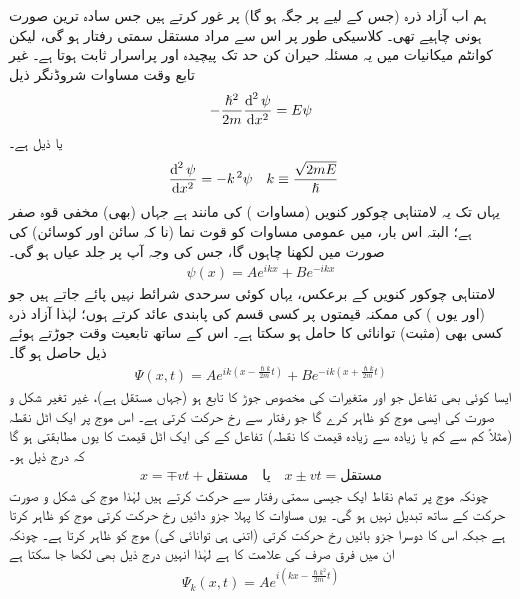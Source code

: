 ہم اب آزاد ذرہ (جس کے لیے پر جگہ  ہو گا) پر غور کرتے ہیں جس سادہ ترین صورت ہونی چاہیے تھی۔ کلاسیکی طور پر اس سے مراد مستقل سمتی رفتار ہو گی، لیکن کوانٹم میکانیات میں یہ مسئلہ حیران کن حد تک پیچیدہ اور پراسرار ثابت ہوتا ہے۔ غیر تابع وقت مساوات شروڈنگر ذیل 
\begin{align}\label{مساوات_شروڈنگر_آزاد_ذرہ_الف}
-\frac{\hslash^{2}}{2m}\frac{\dif^{\,2}{\psi}}{\dif{x^{2}}}=E\psi
\end{align}
یا ذیل ہے۔
\begin{align}
\frac{\dif^{\,2}{\psi}}{\dif{x^{2}}}&=-k^{\,2}\psi&& k\equiv\frac{\sqrt{2mE}}{\hslash}
\end{align}
یہاں تک یہ لامتناہی چوکور کنویں  (مساوات ) کی مانند ہے جہاں (بھی) مخفی قوہ صفر ہے؛ البتہ اس بار، میں عمومی مساوات کو قوت نما (نا کہ سائن اور کوسائن) کی صورت میں لكهنا چاہوں گا، جس کی وجہ آپ پر جلد عیاں ہو گی۔
\begin{align}
\psi(x)=Ae^{ikx}+Be^{-ikx}
\end{align}
لامتناہی چوکور کنویں  کے برعکس، یہاں کوئی سرحدی شرائط نہیں پائے جاتے ہیں جو  (اور یوں ) کی ممکنہ قیمتوں پر کسی قسم کی پابندی عائد کرتے ہوں؛ لہٰذا آزاد ذرہ کسی بھی (مثبت) توانائی کا حامل ہو سکتا ہے۔ اس کے ساتھ تابعیت وقت 
جوڑتے ہوئے ذیل حاصل ہو گا۔
\begin{align}\label{مساوات_شروڈنگر_آزاد_ذرہ_حرکت}
\Psi(x,t)=Ae^{ik(x-\frac{\hslash k}{2m}t)}+Be^{-ik(x+\frac{\hslash k}{2m}t)}
\end{align}
ایسا کوئی بھی تفاعل جو  اور  متغیرات کی مخصوص جوڑ  کا تابع ہو (جہاں  مستقل ہے)، 
 غیر تغیر شکل و صورت کی ایسی موج کو ظاہر کرے گا جو  رفتار سے  رخ حرکت کرتی ہے۔ اس موج پر ایک اٹل نقطہ (مثلاً کم سے کم یا زیادہ سے زیادہ قیمت کا نقطہ) تفاعل کے  کی ایک اٹل قیمت کا یوں مطابقتی ہو گا کہ درج ذیل ہو۔
\begin{align*}
x=\mp vt+\text{مستقل}\quad \text{یا}\quad x\pm vt=\text{مستقل}
\end{align*}
چونکہ موج پر تمام نقاط ایک جیسی سمتی رفتار سے حرکت کرتے ہیں لہٰذا موج کی شکل و صورت حرکت کے ساتھ تبدیل نہیں ہو گی۔ یوں مساوات  کا پہلا جزو دائیں رخ حرکت کرتی موج کو ظاہر کرتا ہے جبکہ اس کا دوسرا جزو بائیں رخ حرکت کرتی (اتنی ہی توانائی کی) موج کو ظاہر کرتا ہے۔ چونکہ ان میں فرق صرف  کی علامت کا ہے لہٰذا انہیں درج ذیل بھی لکھا جا سکتا ہے 
\begin{align}\label{مساوات_غیر_تابع_دائیں_رخ_چلتی}
\Psi_{k}(x,t)=Ae^{i(kx-\frac{\hslash k^{2}}{2m}t)}
\end{align}

